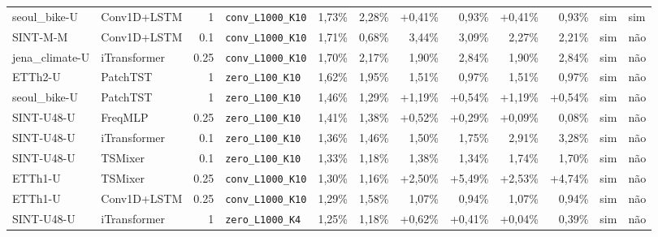 \begin{longtable}{llrlrrrrrrll}
seoul\_bike-U & Conv1D+LSTM & 1 & \texttt{conv\_\allowbreak{}L1000\_\allowbreak{}K10} & \textminus{}1,73\% & \textminus{}2,28\% & +0,41\% & \textminus{}0,93\% & +0,41\% & \textminus{}0,93\% & sim & sim \\
SINT-M-M & Conv1D+LSTM & 0.1 & \texttt{conv\_\allowbreak{}L1000\_\allowbreak{}K10} & \textminus{}1,71\% & \textminus{}0,68\% & \textminus{}3,44\% & \textminus{}3,09\% & \textminus{}2,27\% & \textminus{}2,21\% & sim & n\~ao \\
jena\_climate-U & iTransformer & 0.25 & \texttt{conv\_\allowbreak{}L1000\_\allowbreak{}K10} & \textminus{}1,70\% & \textminus{}2,17\% & \textminus{}1,90\% & \textminus{}2,84\% & \textminus{}1,90\% & \textminus{}2,84\% & sim & n\~ao \\
ETTh2-U & PatchTST & 1 & \texttt{zero\_\allowbreak{}L100\_\allowbreak{}K10} & \textminus{}1,62\% & \textminus{}1,95\% & \textminus{}1,51\% & \textminus{}0,97\% & \textminus{}1,51\% & \textminus{}0,97\% & sim & n\~ao \\
seoul\_bike-U & PatchTST & 1 & \texttt{zero\_\allowbreak{}L100\_\allowbreak{}K10} & \textminus{}1,46\% & \textminus{}1,29\% & +1,19\% & +0,54\% & +1,19\% & +0,54\% & sim & n\~ao \\
SINT-U48-U & FreqMLP & 0.25 & \texttt{zero\_\allowbreak{}L100\_\allowbreak{}K10} & \textminus{}1,41\% & \textminus{}1,38\% & +0,52\% & +0,29\% & +0,09\% & \textminus{}0,08\% & sim & n\~ao \\
SINT-U48-U & iTransformer & 0.1 & \texttt{zero\_\allowbreak{}L100\_\allowbreak{}K10} & \textminus{}1,36\% & \textminus{}1,46\% & \textminus{}1,50\% & \textminus{}1,75\% & \textminus{}2,91\% & \textminus{}3,28\% & sim & n\~ao \\
SINT-U48-U & TSMixer & 0.1 & \texttt{zero\_\allowbreak{}L100\_\allowbreak{}K10} & \textminus{}1,33\% & \textminus{}1,18\% & \textminus{}1,38\% & \textminus{}1,34\% & \textminus{}1,74\% & \textminus{}1,70\% & sim & n\~ao \\
ETTh1-U & TSMixer & 0.25 & \texttt{conv\_\allowbreak{}L1000\_\allowbreak{}K10} & \textminus{}1,30\% & \textminus{}1,16\% & +2,50\% & +5,49\% & +2,53\% & +4,74\% & sim & n\~ao \\
ETTh1-U & Conv1D+LSTM & 0.25 & \texttt{conv\_\allowbreak{}L1000\_\allowbreak{}K10} & \textminus{}1,29\% & \textminus{}1,58\% & \textminus{}1,07\% & \textminus{}0,94\% & \textminus{}1,07\% & \textminus{}0,94\% & sim & n\~ao \\
SINT-U48-U & iTransformer & 1 & \texttt{zero\_\allowbreak{}L1000\_\allowbreak{}K4} & \textminus{}1,25\% & \textminus{}1,18\% & +0,62\% & +0,41\% & +0,04\% & \textminus{}0,39\% & sim & n\~ao \\

\end{longtable}
